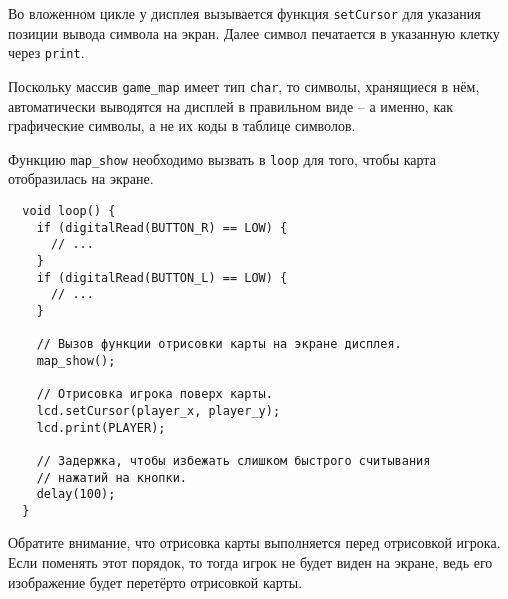 \documentclass[../sparc.tex]{subfiles}
\begin{document}
Во вложенном цикле у дисплея вызывается функция \texttt{setCursor} для указания
позиции вывода символа на экран.  Далее символ печатается в указанную клетку
через \texttt{print}.

Поскольку массив \texttt{game\_map} имеет тип \texttt{char}, то символы,
хранящиеся в нём, автоматически выводятся на дисплей в правильном виде -- а
именно, как графические символы, а не их коды в таблице символов.

Функцию \texttt{map\_show} необходимо вызвать в \texttt{loop} для того, чтобы
карта отобразилась на экране.

\begin{verbatim}
  void loop() {
    if (digitalRead(BUTTON_R) == LOW) {
      // ...
    }
    if (digitalRead(BUTTON_L) == LOW) {
      // ...
    }

    // Вызов функции отрисовки карты на экране дисплея.
    map_show();

    // Отрисовка игрока поверх карты.
    lcd.setCursor(player_x, player_y);
    lcd.print(PLAYER);

    // Задержка, чтобы избежать слишком быстрого считывания
    // нажатий на кнопки.
    delay(100);
  }
\end{verbatim}

Обратите внимание, что отрисовка карты выполняется перед отрисовкой игрока.
Если поменять этот порядок, то тогда игрок не будет виден на экране, ведь его
изображение будет перетёрто отрисовкой карты.
\end{document}
